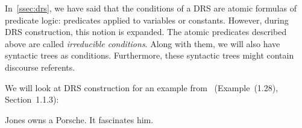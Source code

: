
\vspace{6mm}

In~\ref{ssec:drs}, we have said that the conditions of a DRS are atomic
formulas of predicate logic: predicates applied to variables or
constants. However, during DRS construction, this notion is expanded. The
atomic predicates described above are called \emph{irreducible
  conditions}. Along with them, we will also have syntactic trees as
conditions. Furthermore, these syntactic trees might contain discourse
referents.

We will look at DRS construction for an example
from~\cite{kamp1993discourse} (Example~(1.28), Section~1.1.3):

\begin{exe}
  \ex \label{ex:jones-porsche} Jones owns a Porsche. It fascinates him.
\end{exe}

